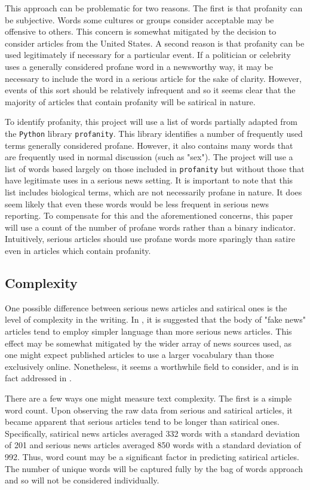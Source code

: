 \documentclass [12 pt] {report}
\begin{document}
This approach can be problematic for two reasons. The first is that profanity can be subjective. Words some cultures or groups consider acceptable may be offensive to others. This concern is somewhat mitigated by the decision to consider articles from the United States. A second reason is that profanity can be used legitimately if necessary for a particular event. If a politician or celebrity uses a generally considered profane word in a newsworthy way, it may be necessary to include the word in a serious article for the sake of clarity. However, events of this sort should be relatively infrequent and so it seems clear that the majority of articles that contain profanity will be satirical in nature.

To identify profanity, this project will use a list of words partially adapted from the \texttt{Python} library \texttt{profanity}. This library identifies a number of frequently used terms generally considered profane. However, it also contains many words that are frequently used in normal discussion (such as "sex"). The project will use a list of words based largely on those included in \texttt{profanity} but without those that have legitimate uses in a serious news setting. It is important to note that this list includes biological terms, which are not necessarily profane in nature. It does seem likely that even these words would be less frequent in serious news reporting. To compensate for this and the aforementioned concerns, this paper will use a count of the number of profane words rather than a binary indicator. Intuitively, serious articles should use profane words more sparingly than satire even in articles which contain profanity.

\subsection{Complexity}
One possible difference between serious news articles and satirical ones is the level of complexity in the writing. In \cite{Horne}, it is suggested that the body of "fake news" articles tend to employ simpler language than more serious news articles. This effect may be somewhat mitigated by the wider array of news sources used, as one might expect published articles to use a larger vocabulary than those exclusively online. Nonetheless, it seems a worthwhile field to consider, and is in fact addressed in \cite{Yang}.

There are a few ways one might measure text complexity. The first is a simple word count. Upon observing the raw data from serious and satirical articles, it became apparent that serious articles tend to be longer than satirical ones. Specifically, satirical news articles averaged 332 words with a standard deviation of 201 and serious news articles averaged 850 words with a standard deviation of 992. Thus, word count may be a significant factor in predicting satirical articles. The number of unique words will be captured fully by the bag of words approach and so will not be considered individually.
\end{document}

